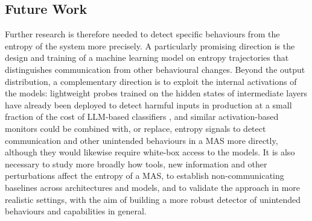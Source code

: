 \subsection*{Future Work}

Further research is therefore needed to detect specific behaviours from the entropy of the system more precisely. A particularly promising direction is the design and training of a machine learning model on entropy trajectories that distinguishes communication from other behavioural changes. Beyond the output distribution, a complementary direction is to exploit the internal activations of the models: lightweight probes trained on the hidden states of intermediate layers have already been deployed to detect harmful inputs in production at a small fraction of the cost of LLM-based classifiers \parencite{kramar2026probes}, and similar activation-based monitors could be combined with, or replace, entropy signals to detect communication and other unintended behaviours in a MAS more directly, although they would likewise require white-box access to the models. It is also necessary to study more broadly how tools, new information and other perturbations affect the entropy of a MAS, to establish non-communicating baselines across architectures and models, and to validate the approach in more realistic settings, with the aim of building a more robust detector of unintended behaviours and capabilities in general.
